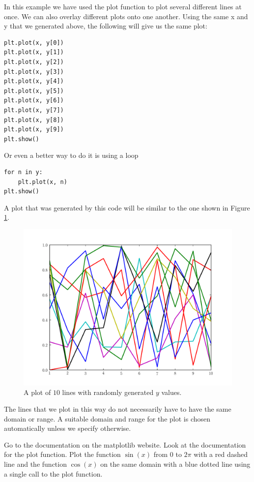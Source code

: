 In this example we have used the plot function to plot several different lines at once. We can also overlay different plots onto one another. Using the same x and y that we generated above, the following will give us the same plot:

\begin{lstlisting}
plt.plot(x, y[0])
plt.plot(x, y[1])
plt.plot(x, y[2])
plt.plot(x, y[3])
plt.plot(x, y[4])
plt.plot(x, y[5])
plt.plot(x, y[6])
plt.plot(x, y[7])
plt.plot(x, y[8])
plt.plot(x, y[9])
plt.show()
\end{lstlisting}
Or even a better way to do it is using a loop
\begin{lstlisting}
for n in y:
    plt.plot(x, n)
plt.show()
\end{lstlisting}

A plot that was generated by this code will be similar to the one shown in Figure \ref{mpl:statemachineexample}.

\begin{figure}
\includegraphics[width=\textwidth]{statemachine.pdf}
\caption{A plot of $10$ lines with randomly generated $y$ values.}
\label{mpl:statemachineexample}
\end{figure}

The lines that we plot in this way do not necessarily have to have the same domain or range.
A suitable domain and range for the plot is chosen automatically unless we specify otherwise.

\begin{problem}
Go to the documentation on the matplotlib website.
Look at the documentation for the plot function.
Plot the function $\sin(x)$ from $0$ to $2\pi$ with a red dashed line and the function $\cos(x)$ on the same domain with a blue dotted line using a single call to the plot function.
\end{problem}

